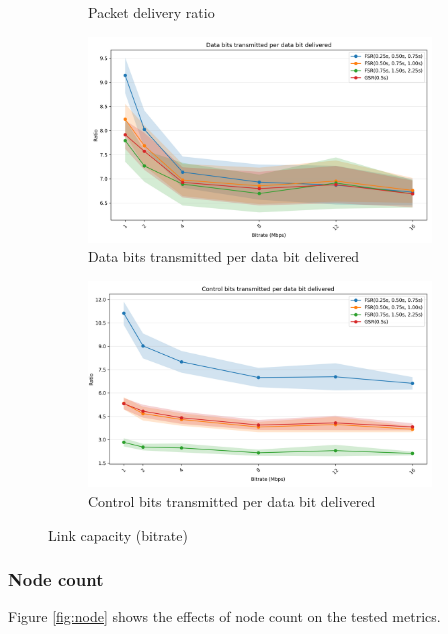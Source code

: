 \documentclass{winslabreport}
\begin{document}
\begin{figure}
\begin{subfigure}[b]{0.45\textwidth}
        \caption{Packet delivery ratio}
        \label{fig:delivery_bitrate}
    \end{subfigure}
    \begin{subfigure}[b]{0.45\textwidth}
        \includegraphics[width=\textwidth]{../figures/bitrate/data_bits_transmitted_per_data_bit_delivered.png}
        \caption{Data bits transmitted per data bit delivered}
        \label{fig:data_bits_bitrate}
    \end{subfigure}
    \begin{subfigure}[b]{0.45\textwidth}
        \includegraphics[width=\textwidth]{../figures/bitrate/control_bits_transmitted_per_data_bit_delivered.png}
        \caption{Control bits transmitted per data bit delivered}
        \label{fig:control_bits_bitrate}
    \end{subfigure}
    \caption{Link capacity (bitrate)}
    \label{fig:bitrate}
\end{figure}

\subsubsection{Node count}
Figure \ref{fig:node} shows the effects of node count on the tested metrics.
\end{document}

